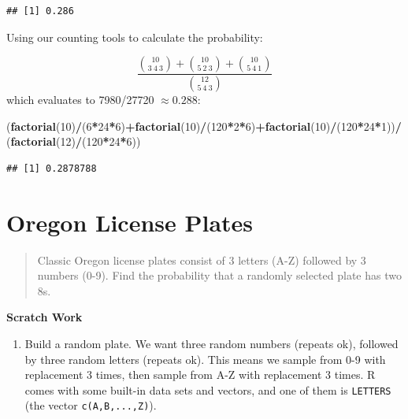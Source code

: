 \documentclass[
]{book}
\newenvironment{Shaded}{\begin{snugshade}}{\end{snugshade}}
\newcommand{\DecValTok}[1]{\textcolor[rgb]{0.00,0.00,0.81}{#1}}
\newcommand{\FunctionTok}[1]{\textcolor[rgb]{0.13,0.29,0.53}{\textbf{#1}}}
\newcommand{\NormalTok}[1]{#1}
\newcommand{\SpecialCharTok}[1]{\textcolor[rgb]{0.81,0.36,0.00}{\textbf{#1}}}
\providecommand{\tightlist}{%
  \setlength{\itemsep}{0pt}\setlength{\parskip}{0pt}}
\theoremstyle{definition}
\theoremstyle{definition}
\theoremstyle{definition}
\theoremstyle{definition}
\theoremstyle{remark}
\begin{document}
\begin{verbatim}
## [1] 0.286
\end{verbatim}

Using our counting tools to calculate the probability:

\[\frac{\binom{10}{3~4~3}+\binom{10}{5~2~3}+\binom{10}{5~4~1}}{\binom{12}{5~4~3}}\]
which evaluates to 7980/27720 \(\approx 0.288\):

\begin{Shaded}
\begin{Highlighting}[]
\NormalTok{(}\FunctionTok{factorial}\NormalTok{(}\DecValTok{10}\NormalTok{)}\SpecialCharTok{/}\NormalTok{(}\DecValTok{6}\SpecialCharTok{*}\DecValTok{24}\SpecialCharTok{*}\DecValTok{6}\NormalTok{)}\SpecialCharTok{+}\FunctionTok{factorial}\NormalTok{(}\DecValTok{10}\NormalTok{)}\SpecialCharTok{/}\NormalTok{(}\DecValTok{120}\SpecialCharTok{*}\DecValTok{2}\SpecialCharTok{*}\DecValTok{6}\NormalTok{)}\SpecialCharTok{+}\FunctionTok{factorial}\NormalTok{(}\DecValTok{10}\NormalTok{)}\SpecialCharTok{/}\NormalTok{(}\DecValTok{120}\SpecialCharTok{*}\DecValTok{24}\SpecialCharTok{*}\DecValTok{1}\NormalTok{))}\SpecialCharTok{/}\NormalTok{(}\FunctionTok{factorial}\NormalTok{(}\DecValTok{12}\NormalTok{)}\SpecialCharTok{/}\NormalTok{(}\DecValTok{120}\SpecialCharTok{*}\DecValTok{24}\SpecialCharTok{*}\DecValTok{6}\NormalTok{))}
\end{Highlighting}
\end{Shaded}

\begin{verbatim}
## [1] 0.2878788
\end{verbatim}

\section{Oregon License Plates}\label{license-plates-R}

\begin{quote}
Classic Oregon license plates consist of 3 letters (A-Z) followed by 3 numbers (0-9). Find the probability that a randomly selected plate has two 8s.
\end{quote}

\textbf{Scratch Work}

\begin{enumerate}
\def\labelenumi{\arabic{enumi}.}
\tightlist
\item
  Build a random plate. We want three random numbers (repeats ok), followed by three random letters (repeats ok). This means we sample from 0-9 with replacement 3 times, then sample from A-Z with replacement 3 times. R comes with some built-in data sets and vectors, and one of them is \texttt{LETTERS} (the vector \texttt{c(\textquotesingle{}A\textquotesingle{},\textquotesingle{}B\textquotesingle{},...,\textquotesingle{}Z\textquotesingle{})}).
\end{enumerate}
\end{document}
